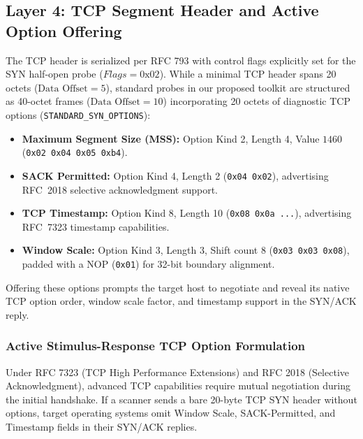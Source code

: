 \documentclass[11pt,a4paper]{article}
\begin{document}
\subsection{Layer 4: TCP Segment Header and Active Option Offering}
The TCP header is serialized per RFC 793 with control flags explicitly set for the SYN half-open probe ($Flags = \text{0x02}$). While a minimal TCP header spans 20 octets ($\text{Data Offset} = 5$), standard probes in our proposed toolkit are structured as 40-octet frames ($\text{Data Offset} = 10$) incorporating 20 octets of diagnostic TCP options (\texttt{STANDARD\_SYN\_OPTIONS}):
\begin{itemize}[nosep, leftmargin=1.5em]
    \item \textbf{Maximum Segment Size (MSS):} Option Kind 2, Length 4, Value $1460$ (\texttt{0x02 0x04 0x05 0xb4}).
    \item \textbf{SACK Permitted:} Option Kind 4, Length 2 (\texttt{0x04 0x02}), advertising RFC~2018 selective acknowledgment support.
    \item \textbf{TCP Timestamp:} Option Kind 8, Length 10 (\texttt{0x08 0x0a ...}), advertising RFC~7323 timestamp capabilities.
    \item \textbf{Window Scale:} Option Kind 3, Length 3, Shift count $8$ (\texttt{0x03 0x03 0x08}), padded with a NOP (\texttt{0x01}) for 32-bit boundary alignment.
\end{itemize}
Offering these options prompts the target host to negotiate and reveal its native TCP option order, window scale factor, and timestamp support in the SYN/ACK reply.

\subsubsection{Active Stimulus-Response TCP Option Formulation}
Under RFC 7323 (TCP High Performance Extensions) and RFC 2018 (Selective Acknowledgment), advanced TCP capabilities require mutual negotiation during the initial handshake. If a scanner sends a bare 20-byte TCP SYN header without options, target operating systems omit Window Scale, SACK-Permitted, and Timestamp fields in their SYN/ACK replies.
\end{document}
